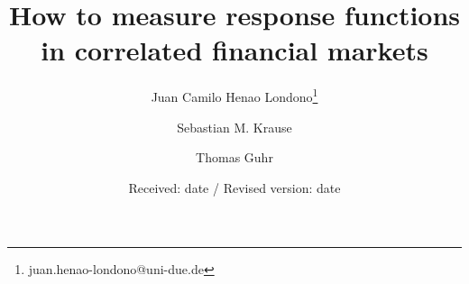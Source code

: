 \title{How to measure response functions in correlated financial markets}
\author{Juan Camilo Henao Londono\thanks{juan.henao-londono@uni-due.de}
        \and Sebastian M. Krause
        \and Thomas Guhr}
\date{Received: date / Revised version: date}
